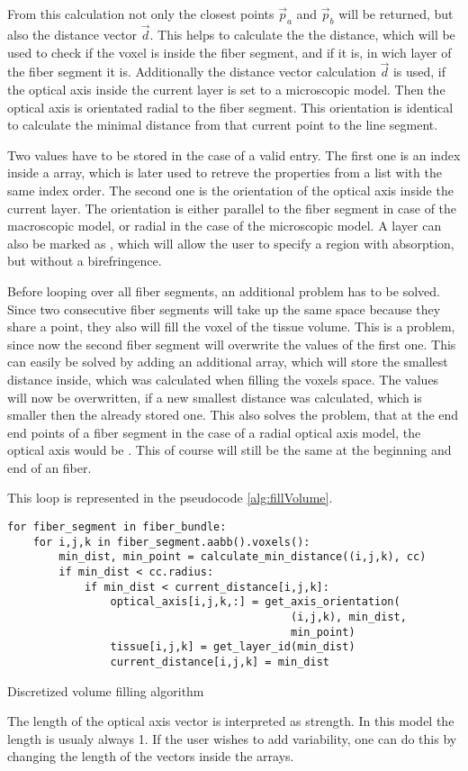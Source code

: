 From this calculation not only the closest points $\vec{p}_a$ and $\vec{p}_b$ will be returned, but also the distance vector $\vec{d}$.
This helps to calculate the the distance, which will be used to check if the voxel is inside the fiber segment, and if it is, in wich layer of the fiber segment it is.
Additionally the distance vector calculation $\vec{d}$ is used, if the optical axis inside the current layer is set to a microscopic model. Then the optical axis is orientated radial to the fiber segment. This orientation is identical to calculate the minimal distance from that current point to the line segment.
\par
%
Two values have to be stored in the case of a valid entry.
The first one is an index inside a  array, which is later used to retreve the properties from a list with the same index order.
The second one is the orientation of the optical axis inside the current layer.
The orientation is either parallel to the fiber segment in case of the macroscopic model, or radial in the case of the microscopic model.
A layer can also be marked as , which will allow the user to specify a region with absorption, but without a birefringence.
\par
%
Before looping over all fiber segments, an additional problem has to be solved.
Since two consecutive fiber segments will take up the same space because they share a point, they also will fill the voxel of the tissue volume.
This is a problem, since now the second fiber segment will overwrite the values of the first one.
This can easily be solved by adding an additional array, which will store the smallest distance inside, which was calculated when filling the voxels space.
The values will now be overwritten, if a new smallest distance was calculated, which is smaller then the already stored one.
This also solves the problem, that at the end end points of a fiber segment in the case of a radial optical axis model, the optical axis would be .
This of course will still be the same at the beginning and end of an fiber.
\par
%
This  loop is represented in the pseudocode \cref{alg:fillVolume}.
%
\begin{lstfloat}[!tb]
\lstset{style=python}
\begin{lstlisting}[]
for fiber_segment in fiber_bundle:
    for i,j,k in fiber_segment.aabb().voxels():
        min_dist, min_point = calculate_min_distance((i,j,k), cc)
        if min_dist < cc.radius:
            if min_dist < current_distance[i,j,k]:
                optical_axis[i,j,k,:] = get_axis_orientation(
                                            (i,j,k), min_dist,
                                            min_point)
                tissue[i,j,k] = get_layer_id(min_dist)
                current_distance[i,j,k] = min_dist
\end{lstlisting}
\caption{Discretized volume filling algorithm}
\label{alg:fillVolume}
\end{lstfloat}
%
The length of the optical axis vector is interpreted as strength. In this model the length is usualy always 1. If the user wishes to add variability, one can do this by changing the length of the vectors inside the arrays.
%
%
%
